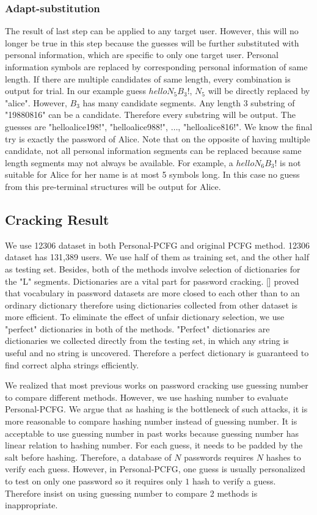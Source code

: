 \documentclass{sig-alternate}
\begin{document}
\subsubsection{Adapt-substitution}
The result of last step can be applied to any target user. However, this will no longer be true in this step because the guesses will be further substituted with personal information, which are specific to only one target user. Personal information symbols are replaced by corresponding personal information of same length. If there are multiple candidates of same length, every combination is output for trial. In our example guess $helloN_5B_3!$, $N_5$ will be directly replaced by "alice". However, $B_3$ has many candidate segments. Any length 3 substring of "19880816" can be a candidate. Therefore every substring will be output. The guesses are "helloalice198!", "helloalice988!", $\ldots$, "helloalice816!". We know the final try is exactly the password of Alice. Note that on the opposite of having multiple candidate, not all personal information segments can be replaced because same length segments may not always be available. For example, a $helloN_6B_3!$ is not suitable for Alice for her name is at most 5 symbols long. In this case no guess from this pre-terminal structures will be output for Alice. 

\subsection{Cracking Result}
We use 12306 dataset in both Personal-PCFG and original PCFG method. 12306 dataset has 131,389 users. We use half of them as training set, and the other half as testing set. Besides, both of the methods involve selection of dictionaries for the "L" segments. Dictionaries are a vital part for password cracking. [] proved that vocabulary in password datasets are more closed to each other than to an ordinary dictionary therefore using dictionaries collected from other dataset is more efficient. To eliminate the effect of unfair dictionary selection, we use "perfect" dictionaries in both of the methods. "Perfect" dictionaries are dictionaries we collected directly from the testing set, in which any string is useful and no string is uncovered. Therefore a perfect dictionary is guaranteed to find correct alpha strings efficiently.

We realized that most previous works on password cracking use guessing number to compare different methods. However, we use hashing number to evaluate Personal-PCFG. We argue that as hashing is the bottleneck of such attacks, it is more reasonable to compare hashing number instead of guessing number. It is acceptable to use guessing number in past works because guessing number has linear relation to hashing number. For each guess, it needs to be padded by the salt before hashing. Therefore, a database of $N$ passwords requires $N$ hashes to verify each guess. However, in Personal-PCFG, one guess is usually personalized to test on only one password so it requires only $1$ hash to verify a guess. Therefore insist on using guessing number to compare 2 methods is inappropriate.
\end{document}
